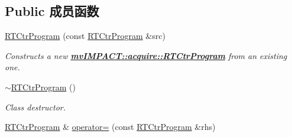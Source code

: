 \subsection*{Public 成员函数}
\begin{DoxyCompactItemize}
\item 
\hyperlink{classmv_i_m_p_a_c_t_1_1acquire_1_1_r_t_ctr_program_a85a17c1481565ea345c117bd71470e16}{R\+T\+Ctr\+Program} (const \hyperlink{classmv_i_m_p_a_c_t_1_1acquire_1_1_r_t_ctr_program}{R\+T\+Ctr\+Program} \&src)
\begin{DoxyCompactList}\small\item\em Constructs a new {\bfseries \hyperlink{classmv_i_m_p_a_c_t_1_1acquire_1_1_r_t_ctr_program}{mv\+I\+M\+P\+A\+C\+T\+::acquire\+::\+R\+T\+Ctr\+Program}} from an existing one. \end{DoxyCompactList}\item 
\hypertarget{classmv_i_m_p_a_c_t_1_1acquire_1_1_r_t_ctr_program_acc3bda72e0bfccbba8443ef9d15bc0c9}{\hyperlink{classmv_i_m_p_a_c_t_1_1acquire_1_1_r_t_ctr_program_acc3bda72e0bfccbba8443ef9d15bc0c9}{$\sim$\+R\+T\+Ctr\+Program} ()}\label{classmv_i_m_p_a_c_t_1_1acquire_1_1_r_t_ctr_program_acc3bda72e0bfccbba8443ef9d15bc0c9}

\begin{DoxyCompactList}\small\item\em Class destructor. \end{DoxyCompactList}\item 
\hypertarget{classmv_i_m_p_a_c_t_1_1acquire_1_1_r_t_ctr_program_a24b2698264f92a65405f9e27d878863b}{\hyperlink{classmv_i_m_p_a_c_t_1_1acquire_1_1_r_t_ctr_program}{R\+T\+Ctr\+Program} \& \hyperlink{classmv_i_m_p_a_c_t_1_1acquire_1_1_r_t_ctr_program_a24b2698264f92a65405f9e27d878863b}{operator=} (const \hyperlink{classmv_i_m_p_a_c_t_1_1acquire_1_1_r_t_ctr_program}{R\+T\+Ctr\+Program} \&rhs)}\label{classmv_i_m_p_a_c_t_1_1acquire_1_1_r_t_ctr_program_a24b2698264f92a65405f9e27d878863b}


\end{DoxyCompactItemize}

